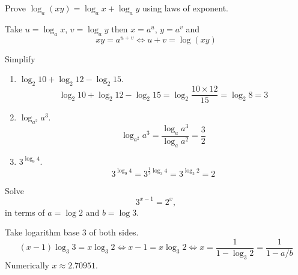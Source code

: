 \documentclass[../calc1-main.tex]{subfiles}
\begin{document}
  \begin{example}
    Prove $\log_a (x y) = \log_a x + \log_a y$ using laws of exponent.
  \end{example}
  \begin{solution}
    Take $u = \log_a x$, $v = \log_a y$ then $x = a^u$, $y = a^v$ and
    \[
      x y = a^{u+v} \iff u + v = \log(xy)
    \]
  \end{solution}

  \begin{example}
    Simplify
    \begin{enumerate}
      \item $\log_2 10 + \log_2 12 - \log_2 15$.
      \[
        \log_2 10 + \log_2 12 - \log_2 15
        = \log_2 \frac{10 \times 12}{15} = \log_2 8 = 3
      \]
      \item $\log_{a^2} a^3$.
      \[
       \log_{a^2} a^3
       = \frac{\log_a a^3}{\log_a a^2} = \frac{3}{2}
     \]
     \item $3^{\log_9 4}$.
     \[
      3^{\log_9 4}
      = 3^{\frac{1}{2} \log_3 4} = 3^{\log_3 2} = 2
    \]
  \end{enumerate}
\end{example}

\begin{example}
  Solve
  \[
    3^{x-1} = 2^x,
  \]
  in terms of $a=\log 2$ and $b=\log 3$.
\end{example}
\begin{solution}
  Take logarithm base 3 of both sides.
  \[
    (x-1) \log_{3} 3 = x \log_{3} 2 \iff
    x-1 = x \log_3 2 \iff
    x = \frac{1}{1- \log_3 2} = \frac{1}{1-a/b}
  \]
  Numerically $x \approx 2.70951$.
\end{solution}
\end{document}
